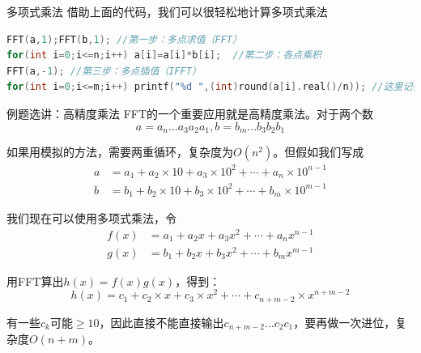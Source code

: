 \documentclass{beamer}
\begin{document}
\begin{frame}[fragile]{多项式乘法}
    借助上面的代码，我们可以很轻松地计算多项式乘法

    \begin{lstlisting}[language=c++]
FFT(a,1);FFT(b,1); //第一步：多点求值（FFT）
for(int i=0;i<=n;i++) a[i]=a[i]*b[i];  //第二步：各点乘积
FFT(a,-1); //第三步：多点插值（IFFT）
for(int i=0;i<=m;i++) printf("%d ",(int)round(a[i].real()/n)); //这里记得要除n
    \end{lstlisting}
\end{frame}

\begin{frame}{例题选讲：高精度乘法}
    \small
    FFT的一个重要应用就是高精度乘法。对于两个数
    \begin{equation*}
        a=a_n...a_3a_2a_1, b=b_m...b_3b_2b_1
    \end{equation*}

    \pause
    如果用模拟的方法，需要两重循环，复杂度为$O(n^2)$。但假如我们写成
    \begin{align*}
        a&= a_1 + a_2\times 10 + a_3\times 10^2 + \cdots  + a_n\times 10^{n-1}\\
        b&= b_1 + b_2\times 10 + b_3\times 10^2 + \cdots  + b_m\times 10^{m-1}
    \end{align*}

    \pause
    我们现在可以使用多项式乘法，令
    \begin{align*}
        f(x)&= a_1 + a_2 x + a_3 x^2 + \cdots  + a_n x^{n-1}\\
        g(x)&= b_1 + b_2 x + b_3 x^2 + \cdots  + b_m x^{m-1}
    \end{align*}

    用FFT算出$h(x)=f(x)g(x)$，得到：
    \begin{equation*}
        h(x)=c_1 + c_2\times x + c_3\times x^2 + \cdots  + c_{n+m-2}\times x^{n+m-2}
    \end{equation*}

    \pause
    有一些$c_k$可能$\geq 10$，因此直接不能直接输出$c_{n+m-2}...c_2c_1$，要再做一次进位，复杂度$O(n+m)$。
\end{frame}
\end{document}
